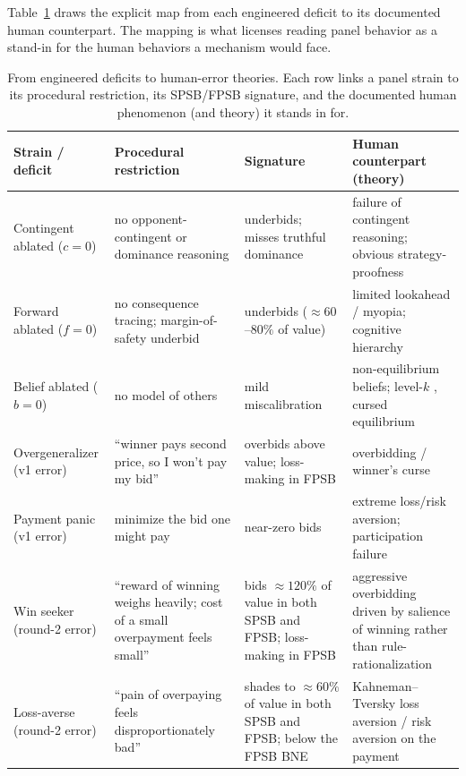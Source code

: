 \documentclass[12pt]{article}
\newcommand{\SPSB}{SPSB}
\begin{document}
Table~\ref{tab:errormap} draws the explicit map from each engineered
deficit to its documented human counterpart. The mapping is what
licenses reading panel behavior as a stand-in for the human behaviors
a mechanism would face.

\begin{table}[t]
\centering
\caption{From engineered deficits to human-error theories. Each row
links a panel strain to its procedural restriction, its
\SPSB{}/FPSB signature, and the documented human phenomenon (and
theory) it stands in for.}
\label{tab:errormap}
\footnotesize
\setlength{\tabcolsep}{4pt}
\begin{tabular}{@{}p{}p{}p{}p{}@{}}
\toprule
Strain / deficit & Procedural restriction & Signature & Human counterpart (theory) \\
\midrule
Contingent ablated ($c{=}0$) & no opponent-contingent or dominance reasoning & underbids; misses truthful dominance & failure of contingent reasoning; obvious strategy-proofness \citep{li2017} \\
\addlinespace
Forward ablated ($f{=}0$) & no consequence tracing; margin-of-safety underbid & underbids ($\approx60$--$80\%$ of value) & limited lookahead / myopia; cognitive hierarchy \\
\addlinespace
Belief ablated ($b{=}0$) & no model of others & mild miscalibration & non-equilibrium beliefs; level-$k$ \citep{crawfordiriberri2007}, cursed equilibrium \citep{eysterrabin2005} \\
\addlinespace
Overgeneralizer (v1 error) & ``winner pays second price, so I won't pay my bid'' & overbids above value; loss-making in FPSB & overbidding / winner's curse \citep{kagellevin1993,crawfordiriberri2007} \\
\addlinespace
Payment panic (v1 error) & minimize the bid one might pay & near-zero bids & extreme loss/risk aversion; participation failure \\
\addlinespace
Win seeker (round-2 error) & ``reward of winning weighs heavily; cost of a small overpayment feels small'' & bids $\approx 120\%$ of value in both \SPSB{} and FPSB; loss-making in FPSB & aggressive overbidding driven by salience of winning rather than rule-rationalization \\
\addlinespace
Loss-averse (round-2 error) & ``pain of overpaying feels disproportionately bad'' & shades to $\approx 60\%$ of value in both \SPSB{} and FPSB; below the FPSB BNE & Kahneman--Tversky loss aversion / risk aversion on the payment \\
\bottomrule
\end{tabular}


\end{table}
\end{document}
